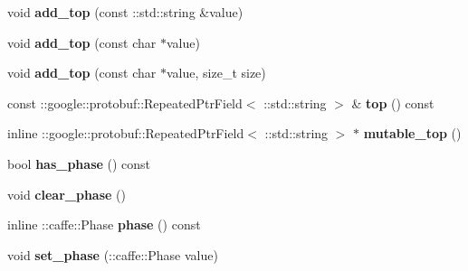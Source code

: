 \begin{DoxyCompactItemize}
\mbox{\label{classcaffe_1_1_layer_parameter_ab755055ee8c0f8f9476bd8cdacccdf35}} 
void {\bfseries add\+\_\+top} (const \+::std\+::string \&value)
\item 
\mbox{\label{classcaffe_1_1_layer_parameter_a9ea29a44735343c893aceca46afb7613}} 
void {\bfseries add\+\_\+top} (const char $\ast$value)
\item 
\mbox{\label{classcaffe_1_1_layer_parameter_aaf1b8be9e70faaf90376f490b1cfa60a}} 
void {\bfseries add\+\_\+top} (const char $\ast$value, size\+\_\+t size)
\item 
\mbox{\label{classcaffe_1_1_layer_parameter_acd7c96b623400eeb1b63bd520d006a4c}} 
const \+::google\+::protobuf\+::\+Repeated\+Ptr\+Field$<$ \+::std\+::string $>$ \& {\bfseries top} () const
\item 
\mbox{\label{classcaffe_1_1_layer_parameter_a59845c27e9cf3627b5fb0b012b326a1c}} 
inline \+::google\+::protobuf\+::\+Repeated\+Ptr\+Field$<$ \+::std\+::string $>$ $\ast$ {\bfseries mutable\+\_\+top} ()
\item 
\mbox{\label{classcaffe_1_1_layer_parameter_a9512cf98cc8d4017d6ffb38af431442f}} 
bool {\bfseries has\+\_\+phase} () const
\item 
\mbox{\label{classcaffe_1_1_layer_parameter_a0af175bd7915484b0941a26bd28f00e6}} 
void {\bfseries clear\+\_\+phase} ()
\item 
\mbox{\label{classcaffe_1_1_layer_parameter_ac585ed5d97a6858d43e1b7cdc35e29c6}} 
inline \+::caffe\+::\+Phase {\bfseries phase} () const
\item 
\mbox{\label{classcaffe_1_1_layer_parameter_a1da6508b7c5e2a39907cf08872b6a3d8}} 
void {\bfseries set\+\_\+phase} (\+::caffe\+::\+Phase value)
\item 
\mbox{\label{classcaffe_1_1_layer_parameter_ab27aa66b8c7925923090edc51551f91c}} 

\end{DoxyCompactItemize}
